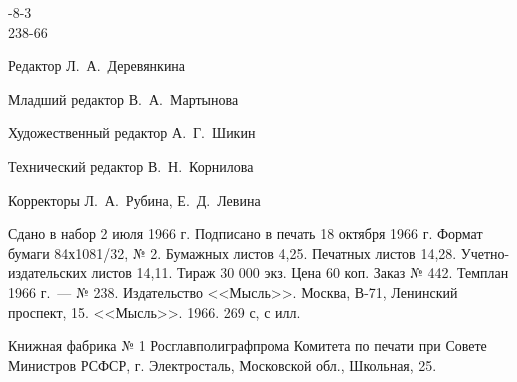 \documentclass[12pt,a4paper,twoside,openany,svgnames]{memoir}
\begin{document}
-8-3\\
238-66\vspace{2cm}

\begin{center}\small\noindent Редактор Л.~А.~Деревянкина

\noindent Младший редактор В.~А.~Мартынова

\noindent Художественный редактор А.~Г.~Шикин

\noindent Технический редактор В.~Н.~Корнилова

\noindent Корректоры Л.~А.~Рубина, Е.~Д.~Левина\vspace{1cm}

\noindent Сдано в набор 2 июля 1966 г. Подписано в печать 18 октября 1966 г. Формат бумаги 84х1081/32, № 2. Бумажных листов 4,25. Печатных листов 14,28. Учетно-издательских листов 14,11. Тираж 30 000 экз. Цена 60 коп. Заказ № 442. Темплан 1966 г.~--- № 238. Издательство <<Мысль>>. Москва, В-71, Ленинский проспект, 15. <<Мысль>>. 1966. 269 с, с илл.\vspace{2cm}

\noindent Книжная фабрика № 1 Росглавполиграфпрома Комитета по печати при Совете Министров РСФСР, г. Электросталь, Московской обл., Школьная, 25.

\end{center}
\end{document}
